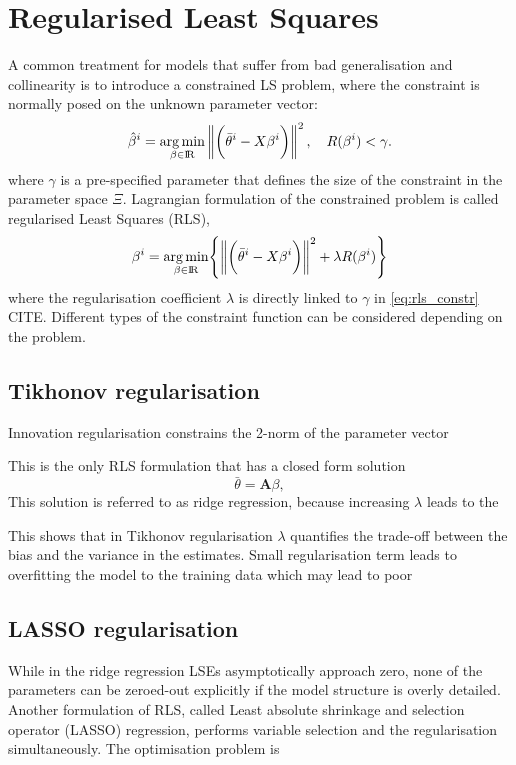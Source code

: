 \documentclass[a4paper,11pt,twoside]{article}
\newcommand{\norm}[1]{\left\lVert#1\right\rVert}
\DeclareMathOperator{\R}{\rm I\!R}
\theoremstyle{mytheoremstyle}
\begin{document}
\section{Regularised Least Squares}
\par A common treatment for models that suffer from bad generalisation and collinearity is to introduce a constrained LS problem, where the constraint is normally posed on the unknown parameter vector:
\begin{equation}\label{eq:rls_constr}
\hat{\mathbf{\beta}}^i = \underset{\beta \in \R}{\arg \min}\norm{ \biggl(\bar{\theta}^i - X \mathbf{\beta}^i \biggr) }^2, \quad R(\mathbf{\beta}^i) < \gamma.
\end{equation}
where $\gamma$ is a pre-specified parameter that defines the size of the constraint in the parameter space $\Xi$.
Lagrangian formulation of the constrained problem is called regularised Least Squares (RLS),
\begin{equation}
\mathbf{\beta}^i = \underset{\beta \in \R}{\arg \min} \Biggl\{\norm{ \biggl(\bar{\theta}^i - X \mathbf{\beta}^i \biggr) }^2 + \lambda R(\mathbf{\beta}^i)\Biggr\}
\end{equation}
where the regularisation coefficient $\lambda$ is directly linked to  $\gamma$ in \eqref{eq:rls_constr} CITE. Different types of the constraint function can be considered depending on the problem.
\subsection{Tikhonov regularisation}
Innovation regularisation  constrains the 2-norm of the parameter vector

This is the only RLS formulation that has a closed form solution
\begin{equation}
\bar{\theta} = \mathbf{A}\beta,
\end{equation}
 This solution is referred to as ridge regression, because increasing $\lambda$ leads to the 


This shows that in Tikhonov regularisation $\lambda$ quantifies the trade-off between the bias and the variance in the estimates. Small regularisation term leads to overfitting the model to the training data which may lead to poor 
\subsection{LASSO regularisation}
\par While in the ridge regression LSEs asymptotically approach zero, none of the parameters can be zeroed-out explicitly if the model structure is overly detailed. Another formulation of RLS, called Least absolute shrinkage and selection operator (LASSO) regression, performs variable selection and the regularisation simultaneously. The optimisation problem is 
\end{document}

